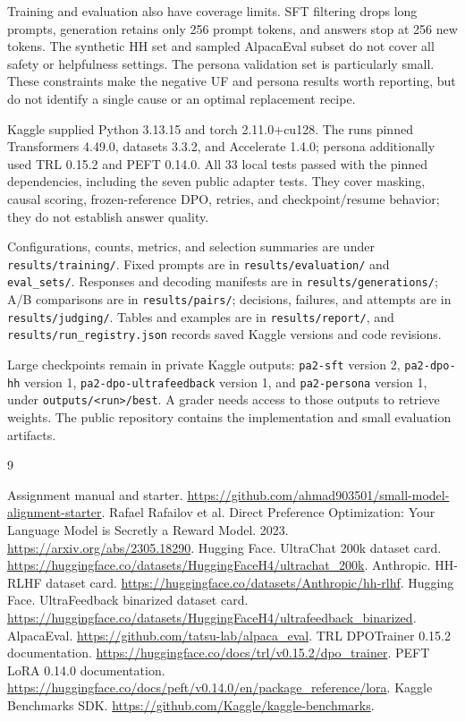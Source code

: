 \documentclass{article}
\begin{document}
Training and evaluation also have coverage limits. SFT filtering drops long prompts, generation retains only 256 prompt tokens, and answers stop at 256 new tokens. The synthetic HH set and sampled AlpacaEval subset do not cover all safety or helpfulness settings. The persona validation set is particularly small. These constraints make the negative UF and persona results worth reporting, but do not identify a single cause or an optimal replacement recipe.

Kaggle supplied Python 3.13.15 and torch 2.11.0+cu128. The runs pinned Transformers 4.49.0, datasets 3.3.2, and Accelerate 1.4.0; persona additionally used TRL 0.15.2 and PEFT 0.14.0. All 33 local tests passed with the pinned dependencies, including the seven public adapter tests. They cover masking, causal scoring, frozen-reference DPO, retries, and checkpoint/resume behavior; they do not establish answer quality.

Configurations, counts, metrics, and selection summaries are under \texttt{results/training/}. Fixed prompts are in \texttt{results/evaluation/} and \texttt{eval\_sets/}. Responses and decoding manifests are in \texttt{results/generations/}; A/B comparisons are in \texttt{results/pairs/}; decisions, failures, and attempts are in \texttt{results/judging/}. Tables and examples are in \texttt{results/report/}, and \texttt{results/run\_registry.json} records saved Kaggle versions and code revisions.

Large checkpoints remain in private Kaggle outputs: \texttt{pa2-sft} version 2, \texttt{pa2-dpo-hh} version 1, \texttt{pa2-dpo-ultrafeedback} version 1, and \texttt{pa2-persona} version 1, under \texttt{outputs/<run>/best}. A grader needs access to those outputs to retrieve weights. The public repository contains the implementation and small evaluation artifacts.

\begin{thebibliography}{9}
\raggedright
{} Assignment manual and starter. \url{https://github.com/ahmad903501/small-model-alignment-starter}.
 Rafael Rafailov et al. Direct Preference Optimization: Your Language Model is Secretly a Reward Model. 2023. \url{https://arxiv.org/abs/2305.18290}.
 Hugging Face. UltraChat 200k dataset card. \url{https://huggingface.co/datasets/HuggingFaceH4/ultrachat_200k}.
 Anthropic. HH-RLHF dataset card. \url{https://huggingface.co/datasets/Anthropic/hh-rlhf}.
 Hugging Face. UltraFeedback binarized dataset card. \url{https://huggingface.co/datasets/HuggingFaceH4/ultrafeedback_binarized}.
 AlpacaEval. \url{https://github.com/tatsu-lab/alpaca_eval}.
 TRL DPOTrainer 0.15.2 documentation. \url{https://huggingface.co/docs/trl/v0.15.2/dpo_trainer}.
 PEFT LoRA 0.14.0 documentation. \url{https://huggingface.co/docs/peft/v0.14.0/en/package_reference/lora}.
 Kaggle Benchmarks SDK. \url{https://github.com/Kaggle/kaggle-benchmarks}.
\end{thebibliography}
\end{document}
